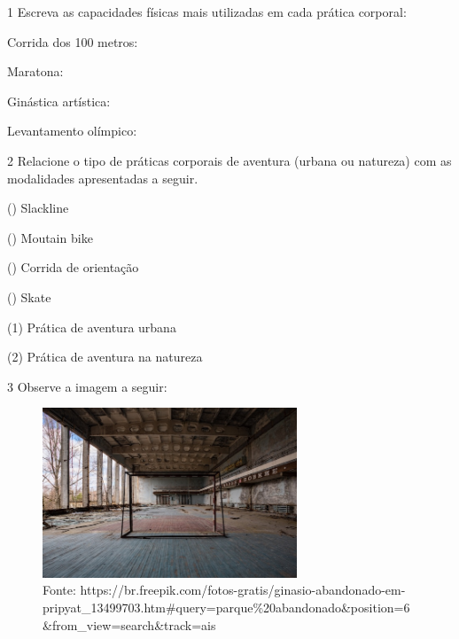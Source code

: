 
\num{1} Escreva as capacidades físicas mais utilizadas em cada prática corporal:

\begin{escolha}
\item
  Corrida dos 100 metros: 
\item
  Maratona: 
\item
  Ginástica artística: 
\item
  Levantamento olímpico: 
\end{escolha}


\num{2} Relacione o tipo de práticas corporais de aventura (urbana ou
  natureza) com as modalidades apresentadas a seguir.

\begin{multicols}{2}

() Slackline

() Moutain bike

() Corrida de orientação

() Skate

\columnbreak

(1) Prática de aventura urbana

(2) Prática de aventura na natureza

\end{multicols}


\num{3} Observe a imagem a seguir:

\begin{figure}[htpb!]
\includegraphics[width=2.99444in,height=1.99477in]{./imgs/img1.jpg}
\caption{Fonte: https://br.freepik.com/fotos-gratis/ginasio-abandonado-em-pripyat\_13499703.htm\#query=parque\%20abandonado\&position=6\&from\_view=search\&track=ais}
\end{figure}


